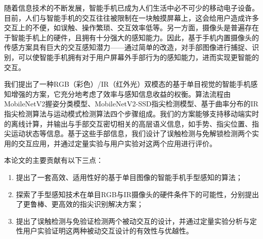 \begin{cabstract}

随着信息技术的不断发展，智能手机已成为人们生活中必不可少的移动电子设备。目前，人们与智能手机的交互往往被限制在一块触摸屏幕上，这会给用户造成许多交互上的不便，如误触、操作繁琐、交互效率低等。另一方面，摄像头是普遍存在于智能手机上的硬件，且拥有十分强大的感知能力。因此，基于手机内置摄像头的传感方案具有巨大的交互感知潜力——通过简单的改造，对手部图像进行捕捉、识别，可以使智能手机拥有对于用户屏幕外手部行为的感知能力，进而实现更智能的交互。

我们提出了一种RGB（彩色）/IR（红外光）双模态的基于单目视觉的智能手机感知增强的方案，它充分地考虑了效率与感知信息收益的权衡。算法流程由MobileNetV2握姿分类模型、MobileNetV2-SSD指尖检测模型、基于曲率分布的IR指尖检测算法与运动模式检测算法四个步骤组成。我们的方案能够支持移动端实时的离线计算，并输出与手部交互密切相关的高层语义信息，如手势、指尖位置、指尖运动状态等信息。基于这些手部信息，我们设计了误触检测与免解锁检测两个实用的交互应用，并通过定量实验与用户实验对这两个应用进行评价。

本论文的主要贡献有以下三点：
\begin{enumerate}
    \item 提出了一套高效、适用性好的基于单目图像的智能手机手型感知的算法；
    \item 探索了手型感知技术在单目RGB与IR摄像头的硬件条件下的可能性，分别提出了更鲁棒、更高效的指尖识别解决方案；
    \item 提出了误触检测与免验证检测两个被动交互的设计，并通过定量实验分析与定性用户实验证明这两种被动交互设计的有效性与优越性。
\end{enumerate}

\end{cabstract}


